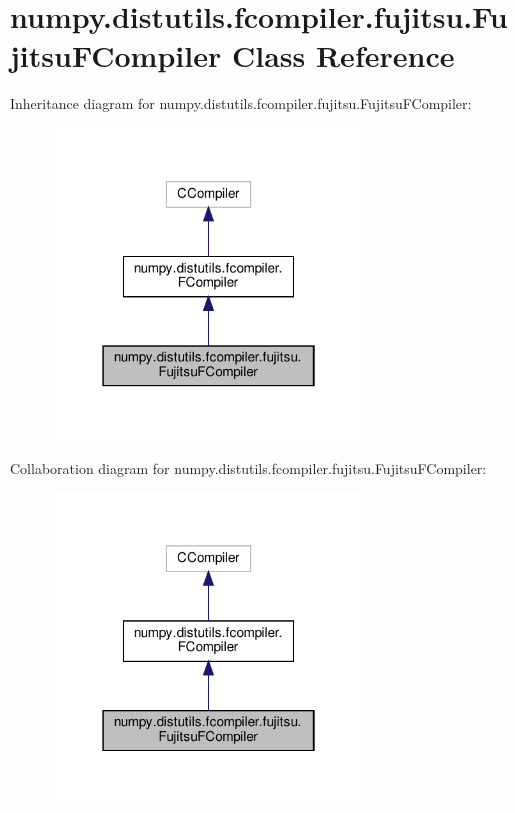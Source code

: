 \hypertarget{classnumpy_1_1distutils_1_1fcompiler_1_1fujitsu_1_1FujitsuFCompiler}{}\section{numpy.\+distutils.\+fcompiler.\+fujitsu.\+Fujitsu\+F\+Compiler Class Reference}
\label{classnumpy_1_1distutils_1_1fcompiler_1_1fujitsu_1_1FujitsuFCompiler}


Inheritance diagram for numpy.\+distutils.\+fcompiler.\+fujitsu.\+Fujitsu\+F\+Compiler\+:
\nopagebreak
\begin{figure}[H]
\begin{center}
\leavevmode
\includegraphics[width=238pt]{classnumpy_1_1distutils_1_1fcompiler_1_1fujitsu_1_1FujitsuFCompiler__inherit__graph}
\end{center}
\end{figure}


Collaboration diagram for numpy.\+distutils.\+fcompiler.\+fujitsu.\+Fujitsu\+F\+Compiler\+:
\nopagebreak
\begin{figure}[H]
\begin{center}
\leavevmode
\includegraphics[width=238pt]{classnumpy_1_1distutils_1_1fcompiler_1_1fujitsu_1_1FujitsuFCompiler__coll__graph}
\end{center}
\end{figure}

